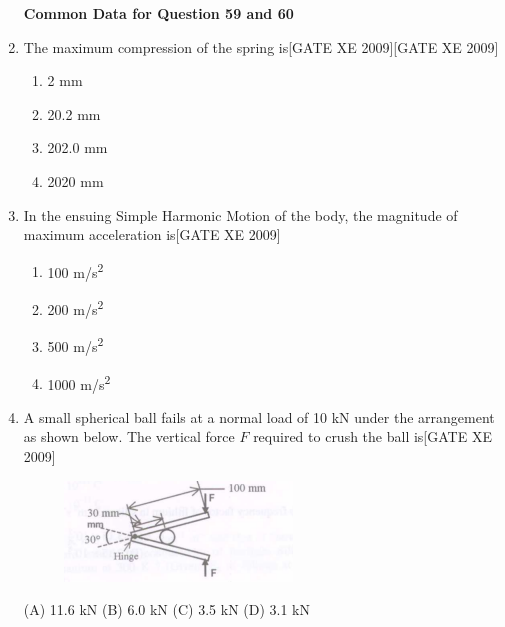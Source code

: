 \documentclass[journal,12pt,onecolumn]{IEEEtran}
\theoremstyle{remark}
\begin{document}
\begin{enumerate}
\textbf{Common Data for Question 59 and 60}

\item The maximum compression of the spring is\hfill[GATE XE 2009]\hfill[GATE XE 2009]
\begin{multicols}{2}
\begin{enumerate}
    \item 2 mm
    \item 20.2 mm
    \item 202.0 mm
    \item 2020 mm
\end{enumerate}
\end{multicols}



\item In the ensuing Simple Harmonic Motion of the body, the magnitude of maximum acceleration is\hfill[GATE XE 2009]
\begin{multicols}{2}
\begin{enumerate}
    \item 100 m/s\textsuperscript{2}
    \item 200 m/s\textsuperscript{2}
    \item 500 m/s\textsuperscript{2}
    \item 1000 m/s\textsuperscript{2}
\end{enumerate}
\end{multicols}




\item A small spherical ball fails at a normal load of 10 kN under the arrangement as shown below. The vertical force $F$ required to crush the ball is\hfill[GATE XE 2009]
\begin{figure}[h]
    \centering
    \includegraphics[width=0.5\columnwidth]{figs/fig6.png}

\end{figure}

    (A) 11.6 kN \hfill
    (B) 6.0 kN \hfill
   (C) 3.5 kN \hfill
   (D) 3.1 kN





\end{enumerate}
\end{document}
